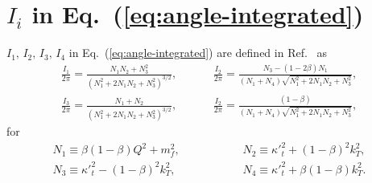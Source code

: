 \documentclass[11pt]{article}
\numberwithin{equation}{section}
\numberwithin{table}{section}
\numberwithin{figure}{section}
\begin{document}
\appendix
\section{$I_i$ in Eq.~(\ref{eq:angle-integrated})}
$I_1,\, I_2,\,  I_3,\,  I_4$ in Eq.~(\ref{eq:angle-integrated}) are defined in Ref.~\cite{Kimber:2001uaa} as
\begin{equation}
	\begin{split}
		\frac{I_1}{2\pi}=\frac{N_1N_2+N_3^2}{\left( N^2_1+2N_1N_2+N_3^2\right)^{3/2}}, &\hspace{1cm}
		\frac{I_2}{2\pi}=\frac{N_3-(1-2\beta)N_1}{(N_1+N_4)\sqrt{ N^2_1+2N_1N_2+N_3^2}},\\
		\frac{I_3}{2\pi}=\frac{N_1+N_2}{\left( N^2_1+2N_1N_2+N_3^2\right)^{3/2}},&\hspace{1cm}
		\frac{I_2}{2\pi}=\frac{(1-\beta)}{(N_1+N_4)\sqrt{ N^2_1+2N_1N_2+N_3^2}},
	\end{split}
\end{equation}
for
\begin{equation}
	\begin{split}
		N_1\equiv\beta(1-\beta)Q^2+m_f^2, &\hspace{2cm}
		N_2\equiv{\kappa'}_t^2+(1-\beta)^2k_T^2,\\
		N_3\equiv{\kappa'}_t^2-(1-\beta)^2k_T^2, &\hspace{2cm}
		N_4\equiv{\kappa'}_t^2+\beta(1-\beta)k_T^2.
	\end{split}
\end{equation}

\newpage




%
% 

%
\end{document}
